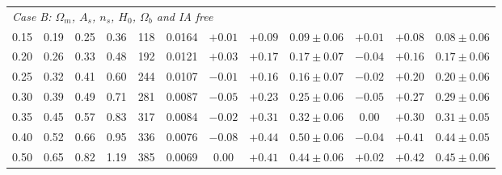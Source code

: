 \begin{table}
\begin{tabular}{c ccc r c ccc ccc}
\midrule
\multicolumn{12}{l}{\emph{Case B: $\Omega_m$, $A_s$, $n_s$, $H_0$, $\Omega_b$ and IA free}}\\
0.15 & 0.19 & 0.25 & 0.36 & 118 & 0.0164 & $+0.01$ & $+0.09$ & $0.09\pm0.06$ & $+0.01$ & $+0.08$ & $0.08\pm0.06$\\
0.20 & 0.26 & 0.33 & 0.48 & 192 & 0.0121 & $+0.03$ & $+0.17$ & $0.17\pm0.07$ & $-0.04$ & $+0.16$ & $0.17\pm0.06$\\
0.25 & 0.32 & 0.41 & 0.60 & 244 & 0.0107 & $-0.01$ & $+0.16$ & $0.16\pm0.07$ & $-0.02$ & $+0.20$ & $0.20\pm0.06$\\
0.30 & 0.39 & 0.49 & 0.71 & 281 & 0.0087 & $-0.05$ & $+0.23$ & $0.25\pm0.06$ & $-0.05$ & $+0.27$ & $0.29\pm0.06$\\
0.35 & 0.45 & 0.57 & 0.83 & 317 & 0.0084 & $-0.02$ & $+0.31$ & $0.32\pm0.06$ & $0.00$ & $+0.30$ & $0.31\pm0.05$\\
0.40 & 0.52 & 0.66 & 0.95 & 336 & 0.0076 & $-0.08$ & $+0.44$ & $0.50\pm0.06$ & $-0.04$ & $+0.41$ & $0.44\pm0.05$\\
0.50 & 0.65 & 0.82 & 1.19 & 385 & 0.0069 & $0.00$ & $+0.41$ & $0.44\pm0.06$ & $+0.02$ & $+0.42$ & $0.45\pm0.06$\\
\bottomrule
\end{tabular}
\end{table}